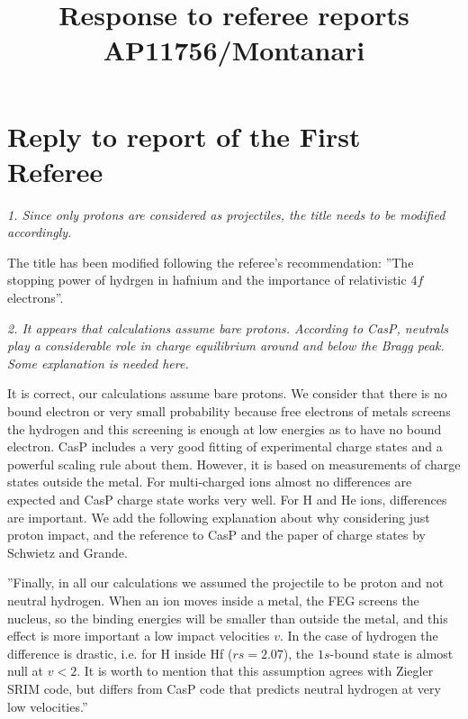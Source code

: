 \documentclass[a4paper,10pt]{article}
\title{Response to referee reports \\ AP11756/Montanari }
\begin{document}
\maketitle

\section{Reply to report of the First Referee}

\textsl{1. Since only protons are considered as projectiles, the title 
needs to be modified accordingly.}

\vspace{0.1cm}
{\color{red} The title has been modified following the referee's recommendation:}
{\small ''The stopping power of hydrgen in hafnium and the importance of relativistic $4f$ electrons''}.

\vspace{0.35cm}
\textsl{2. It appears that calculations assume bare protons. According 
to CasP, neutrals play a considerable role in charge equilibrium around 
and below the Bragg peak. Some explanation is needed here.}

\vspace{0.1cm}
{\color{red} It is correct, our calculations assume bare protons. We consider that there is no bound electron or very small probability because free electrons of metals screens the hydrogen and this screening is enough at low energies as to have no bound electron. CasP includes a very good fitting of experimental charge states and a powerful scaling rule about them. However, it is based on measurements of charge states outside the metal. For multi-charged ions almost no differences are expected and CasP charge state works very well. For H and He ions, differences are important.  We add the following explanation about why considering just proton impact, and the reference to CasP and the paper of charge states by Schwietz and Grande.}

\vspace{0.1cm}
{\small ''Finally, in all our calculations we assumed the projectile to be proton and not neutral hydrogen. When an ion moves inside a metal, the FEG screens the nucleus, so the binding energies will be smaller than outside the metal, and this effect is more important a low impact velocities $v$. In the case of hydrogen the difference is drastic, i.e. for H inside Hf ($rs=2.07$), the $1s$-bound state is almost null at $v<2$. It is worth to mention that this assumption agrees with Ziegler SRIM code, but differs from CasP code that predicts neutral hydrogen at very low velocities.''}
\end{document}
